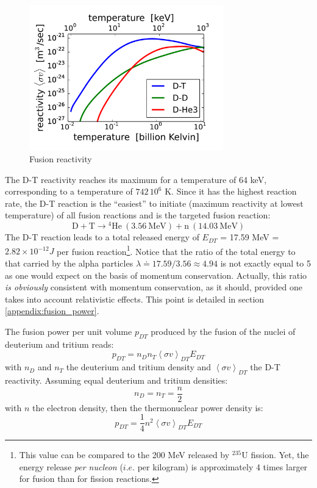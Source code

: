 \begin{figure} 
\begin{center}
\includegraphics[width=0.75\textwidth]{figures/reactivity_DT.png}
\caption{Fusion reactivity }
\label{fig:reactivity}
\end{center}
\end{figure}

The D-T reactivity reaches its maximum for a temperature of 64 keV, corresponding to a temperature of $742\,10^6$ K. Since it has the highest reaction rate, the D-T reaction is the “easiest” to initiate (maximum reactivity at lowest temperature) of all fusion reactions and is the targeted fusion reaction\cite{FusionCEA1987}: 
\begin{equation}
\mathrm{D + T} \longrightarrow \mathrm{{}^4 He~(3.56~MeV) + n~(14.03~MeV)}
\end{equation}
The D-T reaction leads to a total released energy of $E_{DT}$ = 17.59 \si{MeV} = $2.82\times 10^{-12} \si{J}$ per fusion reaction\footnote{This value can be compared to the 200 MeV released by $^{235}$U fission. Yet, the energy release \emph{per nucleon} ($i.e.$ per kilogram) is approximately 4 times larger for fusion than for fission reactions.}. Notice that the ratio of the total energy to that carried by the alpha particles $\lambda \doteq 17.59/3.56 \approx 4.94$ is not exactly equal to 5 as one would expect on the basis of momentum conservation. Actually, this ratio \emph{is obviously} consistent with momentum conservation, as it should, provided one takes into account relativistic effects. This point is detailed in section \ref{appendix:fusion_power}.

The fusion power per unit volume $p_{DT}$ produced by the fusion of the nuclei of deuterium and tritium reads: 
\begin{equation}
  p_{DT} = n_D n_T \left< \sigma v \right>_{DT} E_{DT}
\end{equation}
with $n_D$ and $n_T$ the deuterium and tritium density and $\left< \sigma v \right>_{DT}$ the D-T reactivity. Assuming equal deuterium and tritium densities:
\begin{equation}
  n_D = n_T = \frac{n}{2}
\end{equation}
with $n$ the electron density, then the thermonuclear power density is:
\begin{equation}
  p_{DT} = \frac{1}{4} n^2 \left< \sigma v \right>_{DT} E_{DT}
\end{equation}

